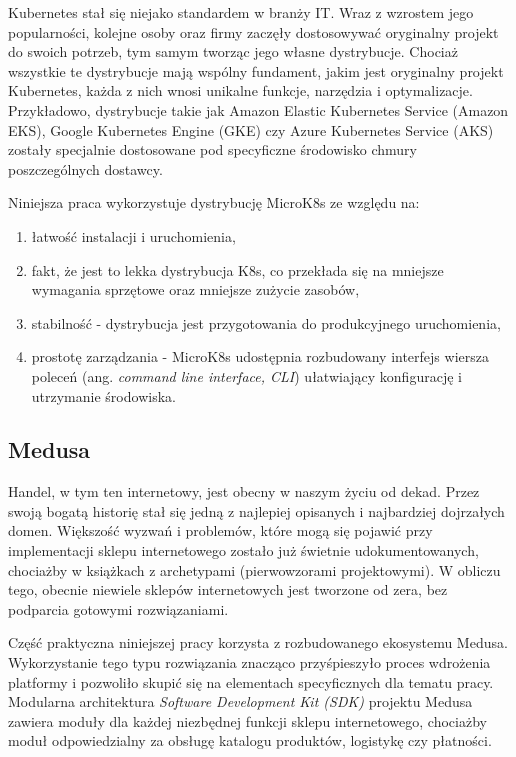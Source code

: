 Kubernetes stał się niejako standardem w branży IT\@.
Wraz z wzrostem jego popularności, kolejne osoby oraz firmy zaczęły dostosowywać oryginalny projekt do swoich potrzeb, tym samym tworząc jego własne dystrybucje.
Chociaż wszystkie te dystrybucje mają wspólny fundament, jakim jest oryginalny projekt Kubernetes, każda z nich wnosi unikalne funkcje, narzędzia i optymalizacje.
Przykładowo, dystrybucje takie jak Amazon Elastic Kubernetes Service (Amazon EKS), Google Kubernetes Engine (GKE) czy Azure Kubernetes Service (AKS) zostały specjalnie dostosowane pod specyficzne środowisko chmury poszczególnych dostawcy.

Niniejsza praca wykorzystuje dystrybucję MicroK8s\cite{microk8s-docs-home} ze względu na:
\begin{enumerate}
    \item łatwość instalacji i uruchomienia,
    \item fakt, że jest to lekka dystrybucja K8s, co przekłada się na mniejsze wymagania sprzętowe oraz mniejsze zużycie zasobów,
    \item stabilność - dystrybucja jest przygotowania do produkcyjnego uruchomienia,
    \item prostotę zarządzania - MicroK8s udostępnia rozbudowany interfejs wiersza poleceń (ang. \emph{command line interface, CLI}) ułatwiający konfigurację i utrzymanie środowiska.
\end{enumerate}

\subsection{Medusa}\label{subsec:medusa}

Handel, w tym ten internetowy, jest obecny w naszym życiu od dekad.
Przez swoją bogatą historię stał się jedną z najlepiej opisanych i najbardziej dojrzałych domen.
Większość wyzwań i problemów, które mogą się pojawić przy implementacji sklepu internetowego zostało już świetnie udokumentowanych, chociażby w książkach z archetypami (pierwowzorami projektowymi).
W obliczu tego, obecnie niewiele sklepów internetowych jest tworzone od zera, bez podparcia gotowymi rozwiązaniami.

Część praktyczna niniejszej pracy korzysta z rozbudowanego ekosystemu Medusa\cite{medusajs-homepage}.
Wykorzystanie tego typu rozwiązania znacząco przyśpieszyło proces wdrożenia platformy i pozwoliło skupić się na elementach specyficznych dla tematu pracy.
Modularna architektura \emph{Software Development Kit (SDK)} projektu Medusa zawiera moduły dla każdej niezbędnej funkcji sklepu internetowego, chociażby moduł odpowiedzialny za obsługę katalogu produktów, logistykę czy płatności.
